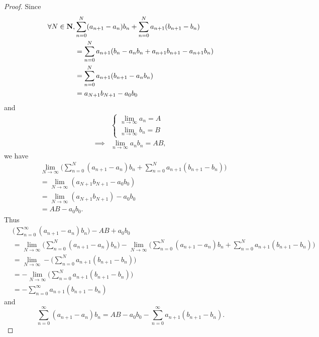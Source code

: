 \begin{proof}
  Since
  \begin{align*}
    \forall N \in \mathbf{N}, & \sum_{n = 0}^N (a_{n + 1} - a_n) b_n + \sum_{n = 0}^N a_{n + 1} (b_{n + 1} - b_n) \\
                      & = \sum_{n = 0}^N a_{n + 1} (b_n - a_n b_n + a_{n + 1} b_{n + 1} - a_{n + 1} b_n)  \\
                      & = \sum_{n = 0}^N a_{n + 1} (b_{n + 1} - a_n b_n)                                  \\
                      & = a_{N + 1} b_{N + 1} - a_0 b_0
  \end{align*}
  and
  \begin{align*}
             & \begin{cases}
                 \lim_{n \to \infty} a_n = A \\
                 \lim_{n \to \infty} b_n = B
               \end{cases}       \\
    \implies & \lim_{n \to \infty} a_n b_n = AB,
  \end{align*}
  we have
  \begin{align*}
     & \lim_{N \to \infty} \bigg(\sum_{n = 0}^N (a_{n + 1} - a_n) b_n + \sum_{n = 0}^N a_{n + 1} (b_{n + 1} - b_n)\bigg) \\
     & = \lim_{N \to \infty} (a_{N + 1} b_{N + 1} - a_0 b_0)                                                             \\
     & = \lim_{N \to \infty} (a_{N + 1} b_{N + 1}) - a_0 b_0                                                             \\
     & = AB - a_0 b_0.
  \end{align*}
  Thus
  \begin{align*}
     & \bigg(\sum_{n = 0}^\infty (a_{n + 1} - a_n) b_n\bigg) - AB + a_0 b_0                                                                                                                       \\
     & = \lim_{N \to \infty} \bigg(\sum_{n = 0}^N (a_{n + 1} - a_n) b_n\bigg) - \lim_{N \to \infty} \bigg(\sum_{n = 0}^N (a_{n + 1} - a_n) b_n + \sum_{n = 0}^N a_{n + 1} (b_{n + 1} - b_n)\bigg) \\
     & = \lim_{N \to \infty} - \bigg(\sum_{n = 0}^N a_{n + 1} (b_{n + 1} - b_n)\bigg)                                                                                                             \\
     & = - \lim_{N \to \infty} \bigg(\sum_{n = 0}^N a_{n + 1} (b_{n + 1} - b_n)\bigg)                                                                                                             \\
     & = - \sum_{n = 0}^\infty a_{n + 1} (b_{n + 1} - b_n)
  \end{align*}
  and
  \[
    \sum_{n = 0}^\infty (a_{n + 1} - a_n) b_n = AB - a_0 b_0 - \sum_{n = 0}^\infty a_{n + 1} (b_{n + 1} - b_n).
  \]
\end{proof}

